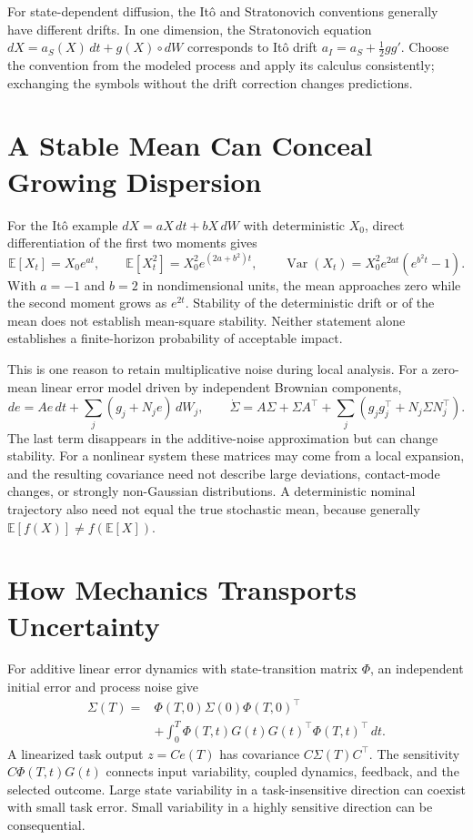 For state-dependent diffusion, the Itô and Stratonovich conventions generally have different drifts. In one dimension, the Stratonovich equation $dX=a_S(X)\,dt+g(X)\circ dW$ corresponds to Itô drift $a_I=a_S+\tfrac12g g'$. Choose the convention from the modeled process and apply its calculus consistently; exchanging the symbols without the drift correction changes predictions.

\section{A Stable Mean Can Conceal Growing Dispersion}

For the Itô example $dX=aX\,dt+bX\,dW$ with deterministic $X_0$, direct differentiation of the first two moments gives
\begin{equation}
\mathbb E[X_t]=X_0e^{at},\qquad
\mathbb E[X_t^2]=X_0^2e^{(2a+b^2)t},\qquad
\operatorname{Var}(X_t)=X_0^2e^{2at}(e^{b^2t}-1).
\end{equation}
With $a=-1$ and $b=2$ in nondimensional units, the mean approaches zero while the second moment grows as $e^{2t}$. Stability of the deterministic drift or of the mean does not establish mean-square stability. Neither statement alone establishes a finite-horizon probability of acceptable impact.

This is one reason to retain multiplicative noise during local analysis. For a zero-mean linear error model driven by independent Brownian components,
\begin{equation}
de=Ae\,dt+\sum_j(g_j+N_je)\,dW_j,\qquad
\dot\Sigma=A\Sigma+\Sigma A^\top+
\sum_j\left(g_jg_j^\top+N_j\Sigma N_j^\top\right).
\end{equation}
The last term disappears in the additive-noise approximation but can change stability. For a nonlinear system these matrices may come from a local expansion, and the resulting covariance need not describe large deviations, contact-mode changes, or strongly non-Gaussian distributions. A deterministic nominal trajectory also need not equal the true stochastic mean, because generally $\mathbb E[f(X)]\ne f(\mathbb E[X])$.

\section{How Mechanics Transports Uncertainty}

For additive linear error dynamics with state-transition matrix $\Phi$, an independent initial error and process noise give
\begin{equation}
\begin{aligned}
\Sigma(T)={}&\Phi(T,0)\Sigma(0)\Phi(T,0)^\top\\
&+\int_0^T\Phi(T,t)G(t)G(t)^\top\Phi(T,t)^\top\,dt .
\end{aligned}
\end{equation}
A linearized task output $z=C e(T)$ has covariance $C\Sigma(T)C^\top$. The sensitivity $C\Phi(T,t)G(t)$ connects input variability, coupled dynamics, feedback, and the selected outcome. Large state variability in a task-insensitive direction can coexist with small task error. Small variability in a highly sensitive direction can be consequential.

